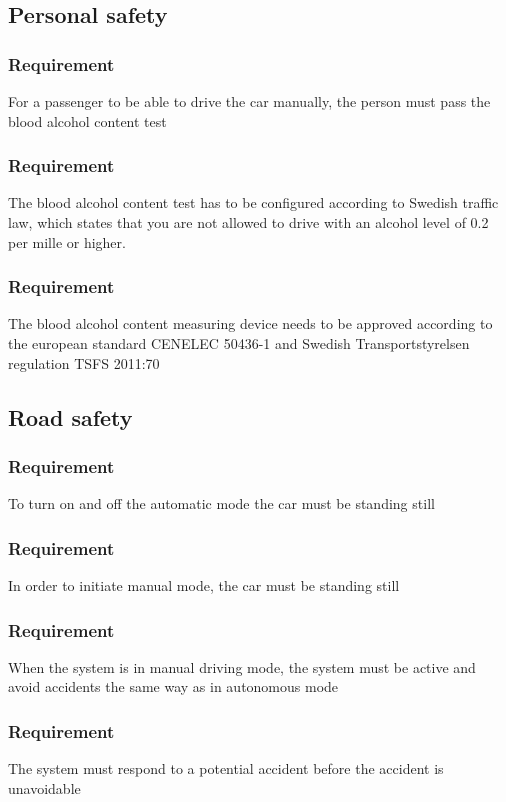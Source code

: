 \documentclass{article}
\begin{document}
{  \subsection{Personal safety}
      \subsubsection{Requirement}
\hfill \break 
\- \- \-For a passenger to be able to drive the car manually, the person must pass the blood alcohol content test
      \subsubsection{Requirement}
\hfill \break 
\- \- \-The blood alcohol content test has to be configured according to Swedish traffic law, which states that you are not allowed to drive with an alcohol level of 0.2 per mille or higher.
      \subsubsection{Requirement}
\hfill \break 
\- \- \-The blood alcohol content measuring device needs to be approved according to the european standard CENELEC 50436-1 and Swedish Transportstyrelsen regulation TSFS 2011:70
  \subsection{Road safety}
      \subsubsection{Requirement}
\hfill \break 
\- \- \-To turn on and off the automatic mode the car must be standing still
      \subsubsection{Requirement}
\hfill \break 
\- \- \-In order to initiate manual mode, the car must be standing still
      \subsubsection{Requirement}
\hfill \break 
\- \- \-When the system is in manual driving mode, the system must be active and avoid accidents the same way as in autonomous mode
      \subsubsection{Requirement}
\hfill \break 
\- \- \-The system must respond to a potential accident before the accident is unavoidable

}
\end{document}
